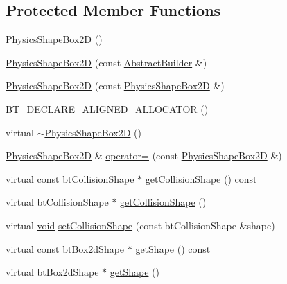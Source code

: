\subsection*{Protected Member Functions}
\begin{DoxyCompactItemize}
\item 
\mbox{\hyperlink{classnjli_1_1_physics_shape_box2_d_a10a881d6e9951bd920eb1ebc53dbe2c7}{Physics\+Shape\+Box2D}} ()
\item 
\mbox{\hyperlink{classnjli_1_1_physics_shape_box2_d_a4e3a1ee2fa643fa7e1d0e75760eef068}{Physics\+Shape\+Box2D}} (const \mbox{\hyperlink{classnjli_1_1_abstract_builder}{Abstract\+Builder}} \&)
\item 
\mbox{\hyperlink{classnjli_1_1_physics_shape_box2_d_ae279a61f007c074ff282ab5eda19c084}{Physics\+Shape\+Box2D}} (const \mbox{\hyperlink{classnjli_1_1_physics_shape_box2_d}{Physics\+Shape\+Box2D}} \&)
\item 
\mbox{\hyperlink{classnjli_1_1_physics_shape_box2_d_aa4b846ab673bd8610370008c78f3ab10}{B\+T\+\_\+\+D\+E\+C\+L\+A\+R\+E\+\_\+\+A\+L\+I\+G\+N\+E\+D\+\_\+\+A\+L\+L\+O\+C\+A\+T\+OR}} ()
\item 
virtual \mbox{\hyperlink{classnjli_1_1_physics_shape_box2_d_a0c79a9523afc160ec1a50e1e4c561bbf}{$\sim$\+Physics\+Shape\+Box2D}} ()
\item 
\mbox{\hyperlink{classnjli_1_1_physics_shape_box2_d}{Physics\+Shape\+Box2D}} \& \mbox{\hyperlink{classnjli_1_1_physics_shape_box2_d_a00f815d6593063c9cf4b886e8e591630}{operator=}} (const \mbox{\hyperlink{classnjli_1_1_physics_shape_box2_d}{Physics\+Shape\+Box2D}} \&)
\item 
virtual const bt\+Collision\+Shape $\ast$ \mbox{\hyperlink{classnjli_1_1_physics_shape_box2_d_ad8d9342f3ef94ae2426cec1c771c0208}{get\+Collision\+Shape}} () const
\item 
virtual bt\+Collision\+Shape $\ast$ \mbox{\hyperlink{classnjli_1_1_physics_shape_box2_d_a484e8759584df9acd50c60740906b201}{get\+Collision\+Shape}} ()
\item 
virtual \mbox{\hyperlink{_thread_8h_af1e856da2e658414cb2456cb6f7ebc66}{void}} \mbox{\hyperlink{classnjli_1_1_physics_shape_box2_d_a5948eb2b64291b9ad1e1ce711326b5c6}{set\+Collision\+Shape}} (const bt\+Collision\+Shape \&shape)
\item 
virtual const bt\+Box2d\+Shape $\ast$ \mbox{\hyperlink{classnjli_1_1_physics_shape_box2_d_a2e9e4d1090ea0041f87e4ac4b040ec34}{get\+Shape}} () const
\item 
virtual bt\+Box2d\+Shape $\ast$ \mbox{\hyperlink{classnjli_1_1_physics_shape_box2_d_a88fc80b2bd00f7615c50e19322acd612}{get\+Shape}} ()
\end{DoxyCompactItemize}
